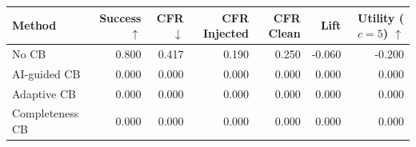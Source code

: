\begin{tabular}{lrrrrrr}
\toprule
Method & Success $\uparrow$ & CFR $\downarrow$ & CFR Injected & CFR Clean & Lift & Utility ($c=5$) $\uparrow$ \\
\midrule
No CB & 0.800 & 0.417 & 0.190 & 0.250 & -0.060 & -0.200 \\
AI-guided CB & 0.000 & 0.000 & 0.000 & 0.000 & 0.000 & 0.000 \\
Adaptive CB & 0.000 & 0.000 & 0.000 & 0.000 & 0.000 & 0.000 \\
Completeness CB & 0.000 & 0.000 & 0.000 & 0.000 & 0.000 & 0.000 \\
\bottomrule
\end{tabular}
